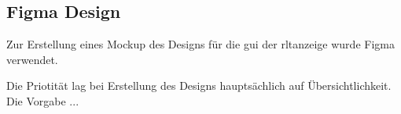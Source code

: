 \subsection{Figma Design}\label{figma_design}
Zur Erstellung eines Mockup des Designs für die \acs{gui} der \acs{rltanzeige} wurde Figma verwendet.

Die Priotität lag bei Erstellung des Designs hauptsächlich auf Übersichtlichkeit. Die Vorgabe ...